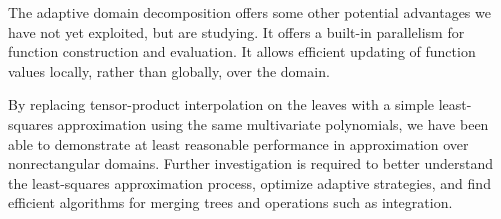 The adaptive domain decomposition offers some other potential advantages we have not yet exploited, but are studying. It offers a built-in parallelism for function construction and evaluation. It allows efficient updating of function values locally, rather than globally, over the domain.

By replacing tensor-product interpolation on the leaves with a simple least-squares approximation using the same multivariate polynomials, we have been able to demonstrate at least reasonable performance in approximation over nonrectangular domains. Further investigation is required to better understand the least-squares approximation process, optimize adaptive strategies, and find efficient algorithms for merging trees and operations such as integration.
